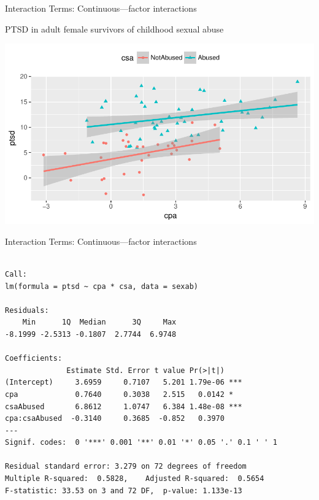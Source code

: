 \documentclass[10pt,ignorenonframetext,compress, aspectratio=169]{beamer}
\begin{document}
\begin{frame}{Interaction Terms: Continuous---factor interactions}

\begin{block}{PTSD in adult female survivors of childhood sexual abuse}

\begin{center}\includegraphics[width=0.7\linewidth]{03-linear-models_files/figure-beamer/sex-abuse-plot-1} \end{center}

\end{block}

\end{frame}

\begin{frame}[fragile]{Interaction Terms: Continuous---factor
interactions}

\scriptsize

\begin{verbatim}

Call:
lm(formula = ptsd ~ cpa * csa, data = sexab)

Residuals:
    Min      1Q  Median      3Q     Max 
-8.1999 -2.5313 -0.1807  2.7744  6.9748 

Coefficients:
              Estimate Std. Error t value Pr(>|t|)    
(Intercept)     3.6959     0.7107   5.201 1.79e-06 ***
cpa             0.7640     0.3038   2.515   0.0142 *  
csaAbused       6.8612     1.0747   6.384 1.48e-08 ***
cpa:csaAbused  -0.3140     0.3685  -0.852   0.3970    
---
Signif. codes:  0 '***' 0.001 '**' 0.01 '*' 0.05 '.' 0.1 ' ' 1

Residual standard error: 3.279 on 72 degrees of freedom
Multiple R-squared:  0.5828,    Adjusted R-squared:  0.5654 
F-statistic: 33.53 on 3 and 72 DF,  p-value: 1.133e-13
\end{verbatim}

\normalsize

\end{frame}
\end{document}
